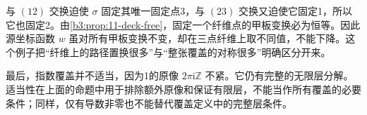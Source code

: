 \ProseParagraphBreak
与 \((12)\) 交换迫使 \(\sigma\) 固定其唯一固定点3，与 \((23)\) 交换又迫使它固定1，所以它也固定2。由\cref{b3:prop:11-deck-free}，固定一个纤维点的甲板变换必为恒等。因此源坐标函数 \(w\) 虽对所有甲板变换不变，却在三点纤维上取不同值，不能下降。这个例子把“纤维上的路径置换很多”与“整张覆盖的对称很多”明确区分开来。

\ProseParagraphBreak
最后，指数覆盖并不适当，因为1的原像 \(2\pi\mathrm{i}\mathbb Z\) 不紧。它仍有完整的无限层分解。适当性在上面的命题中用于排除额外原像和保证有限层，不能当作所有覆盖的必要条件；同样，仅有导数非零也不能替代覆盖定义中的完整层条件。
